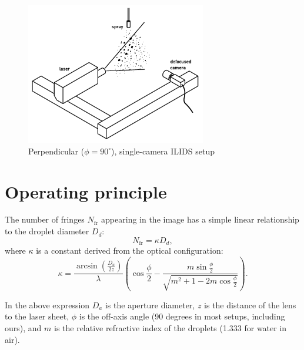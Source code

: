 \documentclass[11.5pt,oneside]{book}
\begin{document}
\begin{figure}
\centering
\includegraphics[width=0.7\textwidth]{img/setup/ipi_setup_simple.pdf}
\caption{Perpendicular ($\phi=90^\circ$), single-camera ILIDS setup
\label{fig:ipi-setup-simple}}
\end{figure}
\section{Operating principle}
The number of fringes $N_\text{fr}$ appearing in the image has a simple linear relationship to
the droplet diameter $D_d$:
\begin{equation}
    N_\text{fr} = \kappa D_d,
\end{equation}
where $\kappa$ is a constant derived from the optical configuration:
\begin{equation}
    \kappa = \frac{\arcsin\left(\frac{D_a}{2z}\right)}{\lambda}
    \left(\cos\frac{\phi}{2} - \frac{m \sin\frac{\phi}{2}}{\sqrt{m^2 + 1 -
    2m\cos \frac{\phi}{2}}}\right).
    \label{kappa}
\end{equation}

In the above expression $D_a$ is the aperture diameter, $z$ is the distance of
the lens to the laser sheet, $\phi$ is the off-axis angle (90 degrees in most
setups, including ours), and $m$ is the relative refractive index of the
droplets (1.333 for water in air).
\end{document}
